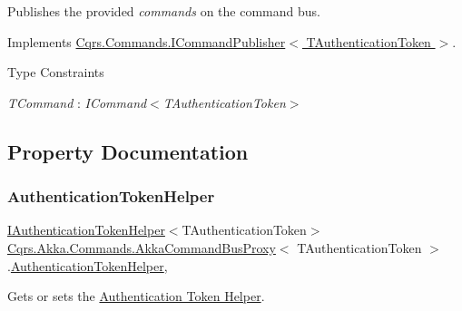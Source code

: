 Publishes the provided {\itshape commands}  on the command bus. 



Implements \hyperlink{interfaceCqrs_1_1Commands_1_1ICommandPublisher_af0f033c0b949e5650032e4f00b11b595_af0f033c0b949e5650032e4f00b11b595}{Cqrs.\+Commands.\+I\+Command\+Publisher$<$ T\+Authentication\+Token $>$}.

\begin{Desc}
\item[Type Constraints]\begin{description}
\item[{\em T\+Command} : {\em I\+Command$<$T\+Authentication\+Token$>$}]\end{description}
\end{Desc}


\subsection{Property Documentation}
\mbox{\label{classCqrs_1_1Akka_1_1Commands_1_1AkkaCommandBusProxy_a6faae6227f1da33928e54a775466f9c9_a6faae6227f1da33928e54a775466f9c9}} 
\subsubsection{\texorpdfstring{Authentication\+Token\+Helper}{AuthenticationTokenHelper}}
{\footnotesize\ttfamily \hyperlink{interfaceCqrs_1_1Authentication_1_1IAuthenticationTokenHelper}{I\+Authentication\+Token\+Helper}$<$T\+Authentication\+Token$>$ \hyperlink{classCqrs_1_1Akka_1_1Commands_1_1AkkaCommandBusProxy}{Cqrs.\+Akka.\+Commands.\+Akka\+Command\+Bus\+Proxy}$<$ T\+Authentication\+Token $>$.\hyperlink{classCqrs_1_1Authentication_1_1AuthenticationTokenHelper}{Authentication\+Token\+Helper}\hspace{0.3cm}{\ttfamily [get]}, {\ttfamily [protected]}}



Gets or sets the \hyperlink{}{Authentication Token Helper}. 

